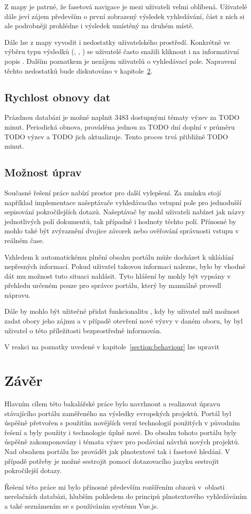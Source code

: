 Z mapy je patrné, že fasetová navigace je mezi uživateli velmi oblíbená. Uživatelé dále jeví zájem především o první zobrazený výsledek vyhledávání, část z nich si ale podrobněji prohlédne i výsledek umístěný na druhém místě.

Dále lze z mapy vyvodit i nedostatky uživatelského prostředí. Konkrétně ve výběru typu výsledků (, , ) se uživatelé často snažili kliknout i na informativní popis . Dalším poznatkem je nezájem uživatelů o vyhledávací pole. Napravení těchto nedostatků bude diskutováno v kapitole~\ref{section:improvements}.


\section{Rychlost obnovy dat}
Prázdnou databázi je možné naplnit 3483 dostupnými tématy výzev za TODO minut. Periodická obnova, prováděna jednou za TODO dní doplní v průměru TODO výzev a TODO jich aktualizuje. Tento proces trvá přibližně TODO minut.


\section{Možnost úprav}\label{section:improvements}
Současné řešení práce nabízí prostor pro další vylepšení. Za zmínku stojí například implementace našeptávače vyhledávacího vstupní pole pro jednodušší sepisování pokročilejších dotazů. Našeptávač by mohl uživateli nabízet jak názvy jednotlivých polí dokumentů, tak případně i hodnoty těchto polí. Přínosné by mohlo také být zvýraznění dvojice závorek nebo ověřování správnosti vstupu v reálném čase.

Vzhledem k automatickému plnění obsahu portálu může docházet k ukládání nepřesných informací. Pokud uživatel takovou informaci nalezne, bylo by vhodné dát mu možnost tuto situaci nahlásit. Tyto hlášení by mohly být vypsány v přehledu určeném pouze pro správce portálu, který by manuálně provedl nápravu. 

Dále by mohlo být užitečné přidat funkcionalitu , kdy by uživatel měl možnost zadat obory jeho zájmu a v případě otevření nové výzvy v daném oboru, by byl uživatel o této příležitosti bezprostředně informován.

V reakci na poznatky uvedené v kapitole~\ref{section:behaviour} lze upravit \blindtext



\chapter{Závěr}
Hlavním cílem této bakalářské práce bylo navrhnout a realizovat úpravu stávajícího portálu zaměřeného na výsledky evropských projektů. Portál byl úspěšně přetvořen s použitím novějších verzí technologií použitých v původním řešení a byly použity i technologie úplně nové. Do obsahu tohoto portálu byly úspěšně zakomponovány i témata výzev pro podávání návrhů nových projektů. Nad obsahem portálu lze provádět jak plnotextové tak i fasetové hledání. V případě potřeby je možné sestrojit pomocí dotazovacího jazyku sestrojit pokročilejší dotazy.

\blindtext %

Řešení této práce mi bylo přínosné především rozšířením obzorů v~oblasti nerelačních databázi, hlubším pohledem do principů plnotextového vyhledáváním a také seznámením se s používáním systému Vue.js.